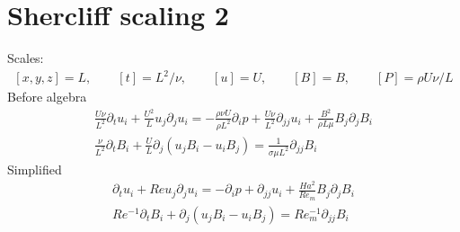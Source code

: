 \documentclass[11pt]{article}
\newcommand{\PD}{\partial}
\begin{document}
\section{Shercliff scaling 2}
Scales:
\begin{equation}\begin{aligned}
	[x,y,z] = L, \qquad
	[t] = L^2 / \nu, \qquad
	[u] = U, \qquad
	[B] = B, \qquad
	[P] = \rho U \nu / L
\end{aligned} \end{equation}
Before algebra
\begin{equation}\begin{aligned}
\frac{U \nu}{L^2} \PD_t u_i+ \frac{U^2}{L} u_j\PD_j u_i =-\frac{\rho \nu U}{\rho L^2}\PD_i p+ \frac{U \nu}{L^2} \PD_{jj} u_i + \frac{B^2}{\rho L \mu} B_j \PD_j B_i \\
\frac{\nu}{L^2} \PD_t B_i + \frac{U}{L} \PD_j (u_j B_i - u_i B_j) = \frac{1}{\sigma \mu L^2} \PD_{jj} B_i
\end{aligned} \end{equation}
Simplified
\begin{equation}\begin{aligned}
\PD_t u_i+ Re u_j\PD_j u_i =-\PD_i p+ \PD_{jj} u_i + \frac{Ha^2}{Re_m} B_j \PD_j B_i \\
Re^{-1} \PD_t B_i + \PD_j (u_j B_i - u_i B_j) = Re_m^{-1} \PD_{jj} B_i
\end{aligned} \end{equation}
\end{document}

